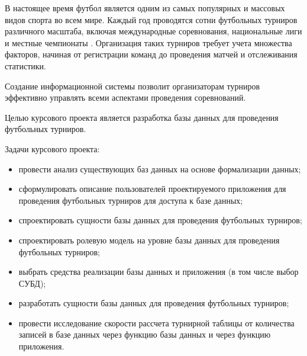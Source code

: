 \introduction
В настоящее время футбол является одним из самых популярных и массовых видов спорта во всем мире. Каждый год проводятся сотни футбольных турниров различного масштаба, включая международные соревнования, национальные лиги и местные чемпионаты \cite{tm}. Организация таких турниров требует учета множества факторов, начиная от регистрации команд до проведения матчей и отслеживания статистики.

Создание информационной системы позволит организаторам турниров эффективно управлять всеми аспектами проведения соревнований.

Целью курсового проекта является разработка базы данных для проведения футбольных турниров.

Задачи курсового проекта:
\begin{itemize}
    \item провести анализ существующих баз данных на основе формализации данных;
    \item сформулировать описание пользователей проектируемого приложения для проведения футбольных турниров для доступа к базе данных;
    \item спроектировать сущности базы данных для проведения футбольных турниров;
    \item спроектировать ролевую модель на уровне базы данных для проведения футбольных турниров;
    \item выбрать средства реализации базы данных и приложения (в том числе выбор СУБД); 
    \item разработать сущности базы данных для проведения футбольных турниров;
    \item провести исследование скорости рассчета турнирной таблицы от количества записей в базе данных через функцию базы данных и через функцию приложения.
\end{itemize}
